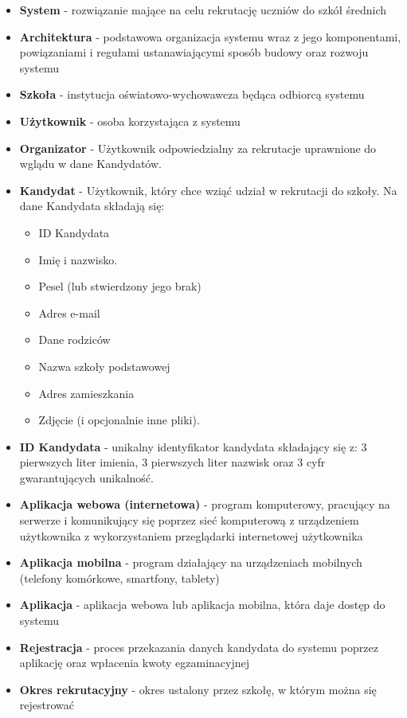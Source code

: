 \documentclass{article}
\begin{document}
\begin{itemize}
	\item \textbf{System} - rozwiązanie mające na celu rekrutację uczniów do szkół średnich
	\item \textbf{Architektura} - podstawowa organizacja systemu wraz z jego komponentami, powiązaniami i regułami ustanawiającymi sposób budowy oraz rozwoju systemu
	\item \textbf{Szkoła} - instytucja oświatowo-wychowawcza będąca odbiorcą systemu
	\item \textbf{Użytkownik} - osoba korzystająca z systemu
	\item \textbf{Organizator} - Użytkownik odpowiedzialny za rekrutacje uprawnione do wglądu w dane Kandydatów.
	\item \textbf{Kandydat} - Użytkownik, który chce wziąć udział w rekrutacji do szkoły. Na dane Kandydata składają się:
      \begin{itemize}
        \item ID Kandydata
        \item Imię i nazwisko.
        \item Pesel (lub stwierdzony jego brak)
        \item Adres e-mail
        \item Dane rodziców
        \item Nazwa szkoły podstawowej
        \item Adres zamieszkania
        \item Zdjęcie (i opcjonalnie inne pliki).
       \end{itemize}
	\item \textbf{ID Kandydata} - unikalny identyfikator kandydata składający się z: 3 pierwszych liter imienia, 3 pierwszych liter nazwisk oraz 3 cyfr gwarantujących unikalność.
	\item \textbf{Aplikacja webowa (internetowa)} - program komputerowy, pracujący na serwerze i komunikujący się poprzez sieć komputerową z urządzeniem użytkownika z wykorzystaniem przeglądarki internetowej użytkownika
	\item \textbf{Aplikacja mobilna} - program działający na urządzeniach mobilnych (telefony komórkowe, smartfony, tablety)
	\item \textbf{Aplikacja} - aplikacja webowa lub aplikacja mobilna, która daje dostęp do systemu
	\item \textbf{Rejestracja} - proces przekazania danych kandydata do systemu poprzez aplikację oraz wpłacenia kwoty egzaminacyjnej
	\item \textbf{Okres rekrutacyjny} - okres ustalony przez szkołę, w którym można się rejestrować

\end{itemize}
\end{document}
